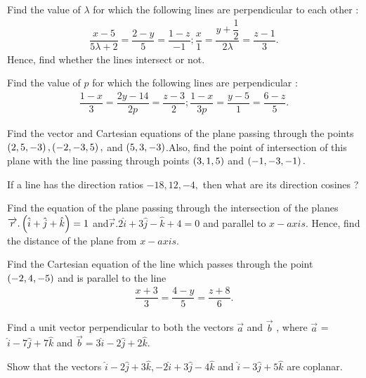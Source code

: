 
\item Find the value of $\lambda$ for which the following lines are perpendicular to each other :
\begin{align*}
    \dfrac{x-5}{5{\lambda+2}}=\dfrac{2-y}{5}=\dfrac{1-z}{-1};\dfrac{x}{1}=\dfrac{y+\dfrac{1}{2}}{2{\lambda}}=\dfrac{z-1}{3}.
\end{align*}
Hence, find whether the lines intersect or not.

\item Find the value of $p$ for which the following lines are perpendicular :
\begin{align*}
\dfrac{1-x}{3}= \dfrac{2y-14}{2p} = \dfrac{z-3}{2}; \dfrac{1-x}{3p} = \dfrac{y-5}{1} = \dfrac{6-z}{5}.
\end{align*}

\item Find the vector and Cartesian equations of the plane passing through the points $\left(2,5,-3\right),\left(-2,-3,5\right),$ and $\left(5,3,-3\right)$.Also, find the point of intersection of this plane with the line passing through points $\left(3,1,5\right) $ and $\left(-1,-3,-1\right).$

\item If a line has the direction ratios $-18, 12, -4,$ then what are its direction cosines ? 

\item Find the equation of the plane passing through the intersection of the planes $\overrightarrow r.\left(\hat{i}+\hat{j}+\hat{k}\right)=1 $ and$\overrightarrow  r .2\hat{i}+3\hat{j}-\hat{k}+4=0 $ and parallel to $x-axis$. Hence, find the distance of the plane from $x-axis$.

\item Find the Cartesian equation of the line which passes through the point $\left(- 2, 4,-5\right)$ and is parallel to the line 
\begin{align*}
\dfrac{x+3}{3}=\dfrac{4-y}{5}=\dfrac{z+8}{6}.
\end{align*}

\item Find a unit vector perpendicular to both the vectors 
$ \overrightarrow a $ and $ \overrightarrow b $ , where $ \overrightarrow a $ = $\hat{i} -7\hat{j} +7\hat{k}$ and $ \overrightarrow b = 3 \hat{i} -2 \hat{j}+ 2 \hat{k}$.

\item Show that the vectors $\hat{i} -2 \hat{j}+ 3 \hat{k},-2 \hat{i}+ 3  \hat{j} -4 \hat{k}$ and $\hat{i} -3 \hat{j}+ 5 \hat{k}$ are coplanar.

